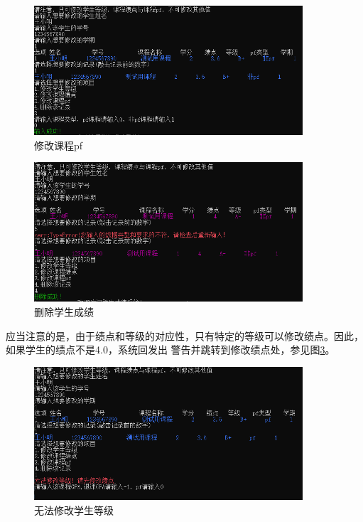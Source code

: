 \documentclass[fontset=windows]{article}
\begin{document}
\newpage

\begin{figure}[h!]
	\begin{center}
		\vspace{-0.3cm}
		\includegraphics[width = 10cm]{修改课程pf.png}
		\caption{修改课程pf}
		\label{ref6}
	\end{center}
\end{figure}

\begin{figure}[h!]
	\begin{center}
		\vspace{-0.3cm}
		\includegraphics[width = 10cm]{case2 成功删除学生成绩.png}
		\caption{删除学生成绩}
		\label{ref7}
	\end{center}
\end{figure}

应当注意的是，由于绩点和等级的对应性，只有特定的等级可以修改绩点。因此，如果学生的绩点不是4.0，系统回发出
警告并跳转到修改绩点处，参见图\ref{ref8}。

\begin{figure}[h!]
	\begin{center}
		\includegraphics[width = 10cm]{无法修改学生等级.png}
		\caption{无法修改学生等级}
		\label{ref8}
	\end{center}
\end{figure}
\end{document}
